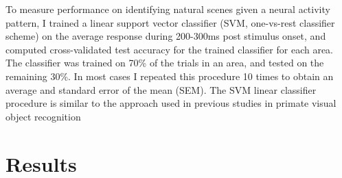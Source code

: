 
To measure performance on identifying natural scenes given a neural activity pattern, I trained a linear support vector classifier (SVM, one-vs-rest classifier scheme) on the average response during 200-300ms post stimulus onset, and computed cross-validated test accuracy for the trained classifier for each area. The classifier was trained on 70\% of the trials in an area, and tested on the remaining 30\%. In most cases I repeated this procedure 10 times to obtain an average and standard error of the mean (SEM). The SVM linear classifier procedure is similar to the approach used in previous studies in primate visual object recognition \parencite{Hung2005,Rust2010a}
\section{Results}
